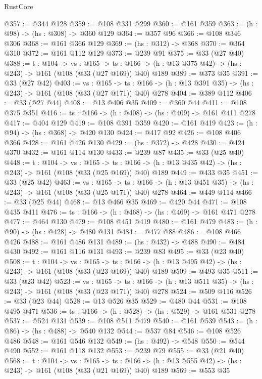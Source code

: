 \begin{lexlean}{RustCore}
\begin{coremodule}
@357 := @344 @128
@359 := @108 @331 @299
@360 := @161 @359
@363 := (h : @98) -> (hs : @308) -> @360 @129
@364 := @357 @96
@366 := @108 @346 @306
@368 := @161 @366 @129
@369 := (hs : @312) -> @368
@370 := @364 @310
@372 := @161 @112 @129
@373 := @239 @91
@375 := @33 (@27 @40)
@388 := {t : @104} ->
  {vs : @165} ->
  {ts : @166} -> (h : @13 @375 @42) -> (hs : @243) -> @161 (@108 (@33 (@27 @169)) @40) @189
@389 := @373 @35
@391 := @33 (@27 @42)
@403 := {vs : @165} ->
  {ts : @166} -> (h : @13 @391 @35) -> (hs : @243) -> @161 (@108 (@33 (@27 @171)) @40) @278
@404 := @389 @112
@406 := @33 (@27 @44)
@408 := @13 @406 @35
@409 := @360 @44
@411 := @108 @375 @351
@416 := {ts : @166} -> (h : @408) -> (hs : @409) -> @161 @411 @278
@417 := @404 @129
@419 := @108 @391 @359
@420 := @161 @419
@423 := (h : @94) -> (hs : @368) -> @420 @130
@424 := @417 @92
@426 := @108 @406 @366
@428 := @161 @426 @130
@429 := (hs : @372) -> @428
@430 := @424 @370
@432 := @161 @114 @130
@433 := @239 @87
@435 := @33 (@25 @40)
@448 := {t : @104} ->
  {vs : @165} ->
  {ts : @166} -> (h : @13 @435 @42) -> (hs : @243) -> @161 (@108 (@33 (@25 @169)) @40) @189
@449 := @433 @35
@451 := @33 (@25 @42)
@463 := {vs : @165} ->
  {ts : @166} -> (h : @13 @451 @35) -> (hs : @243) -> @161 (@108 (@33 (@25 @171)) @40) @278
@464 := @449 @114
@466 := @33 (@25 @44)
@468 := @13 @466 @35
@469 := @420 @44
@471 := @108 @435 @411
@476 := {ts : @166} -> (h : @468) -> (hs : @469) -> @161 @471 @278
@477 := @464 @130
@479 := @108 @451 @419
@480 := @161 @479
@483 := (h : @90) -> (hs : @428) -> @480 @131
@484 := @477 @88
@486 := @108 @466 @426
@488 := @161 @486 @131
@489 := (hs : @432) -> @488
@490 := @484 @430
@492 := @161 @116 @131
@493 := @239 @83
@495 := @33 (@23 @40)
@508 := {t : @104} ->
  {vs : @165} ->
  {ts : @166} -> (h : @13 @495 @42) -> (hs : @243) -> @161 (@108 (@33 (@23 @169)) @40) @189
@509 := @493 @35
@511 := @33 (@23 @42)
@523 := {vs : @165} ->
  {ts : @166} -> (h : @13 @511 @35) -> (hs : @243) -> @161 (@108 (@33 (@23 @171)) @40) @278
@524 := @509 @116
@526 := @33 (@23 @44)
@528 := @13 @526 @35
@529 := @480 @44
@531 := @108 @495 @471
@536 := {ts : @166} -> (h : @528) -> (hs : @529) -> @161 @531 @278
@537 := @524 @131
@539 := @108 @511 @479
@540 := @161 @539
@543 := (h : @86) -> (hs : @488) -> @540 @132
@544 := @537 @84
@546 := @108 @526 @486
@548 := @161 @546 @132
@549 := (hs : @492) -> @548
@550 := @544 @490
@552 := @161 @118 @132
@553 := @239 @79
@555 := @33 (@21 @40)
@568 := {t : @104} ->
  {vs : @165} ->
  {ts : @166} -> (h : @13 @555 @42) -> (hs : @243) -> @161 (@108 (@33 (@21 @169)) @40) @189
@569 := @553 @35

\end{coremodule}
\end{lexlean}

